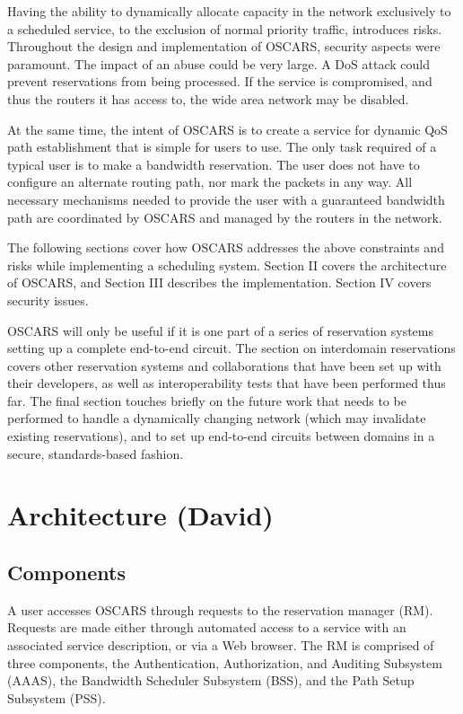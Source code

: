 \documentclass[conference]{IEEEtran}
\begin{document}
Having the ability to dynamically allocate capacity in the network exclusively 
to a scheduled service, to the exclusion of normal priority traffic, introduces 
risks.
Throughout the design and implementation of OSCARS, security aspects were
paramount.  The impact of an abuse could be very
large.  A DoS attack could prevent reservations from being processed.  If the
service is compromised, and thus the routers it has access to, the wide
area network may be disabled.

At the same time, the intent of OSCARS is to create a service for dynamic QoS 
path establishment that is simple for users to use. The only task required of a
typical user is to make a bandwidth reservation. The user does not have to 
configure an alternate routing path, nor mark the packets in any way. All 
necessary mechanisms needed to provide the user with a guaranteed bandwidth 
path are coordinated by OSCARS and managed by the routers in the network.

The following sections cover how OSCARS addresses the above constraints and
risks while implementing a scheduling system.
Section II covers the architecture of OSCARS, and
Section III describes the implementation.  Section IV covers security issues.

OSCARS will only be useful if it is one part of a series of reservation
systems setting up a complete end-to-end circuit.
The section on interdomain reservations covers other reservation systems and 
collaborations that have been set up with their developers, as well as 
interoperability tests that have been performed thus far.  The final section 
touches briefly on the future work that needs to be performed
to handle a dynamically changing network (which may invalidate existing
reservations), and to set up end-to-end circuits between domains
in a secure, standards-based fashion.

\section{Architecture (David)}

\subsection{Components}

A user accesses OSCARS
through requests to the reservation manager (RM).  Requests are made either
through automated access to a service with an associated service description, 
or via a Web browser.  The RM is comprised of three components, the 
Authentication, Authorization, and Auditing Subsystem (AAAS), the Bandwidth 
Scheduler Subsystem (BSS), and the Path Setup Subsystem (PSS).
\end{document}
